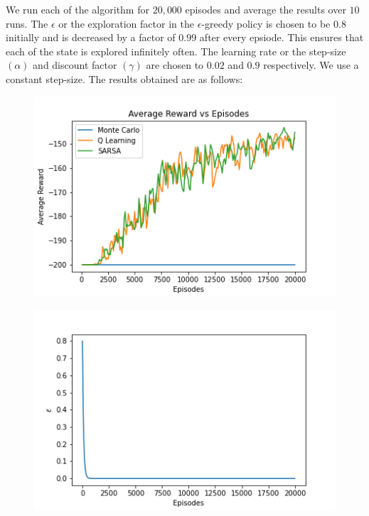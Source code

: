 \documentclass{article}
\begin{document}
\noindent %
We run each of the algorithm for $20,000$ episodes and average the results over $10$ runs. The $\epsilon$ or the exploration factor
in the $\epsilon$-greedy policy is chosen to be $0.8$ initially and is decreased by a factor of $0.99$ after every epsiode. This ensures
that each of the state is explored infinitely often. The learning rate or the step-size $(\alpha)$ and discount factor $(\gamma)$ are 
chosen to $0.02$ and $0.9$ respectively. We use a constant step-size. The results obtained are as follows:\par

\begin{figure}[H]
    \graphicspath{ {../experiments/MountainCar/} }
    \centering
    \begin{minipage}{.5\textwidth}
      \centering
      \includegraphics[width=\linewidth]{Mountaincar.png}
      \label{fig:test1}
    \end{minipage}%
    \begin{minipage}{.5\textwidth}
      \centering
      \includegraphics[width=\linewidth]{Mountaincar_epsilon.png}
      \label{fig:test2}
    \end{minipage}
    \end{figure}
\end{document}

